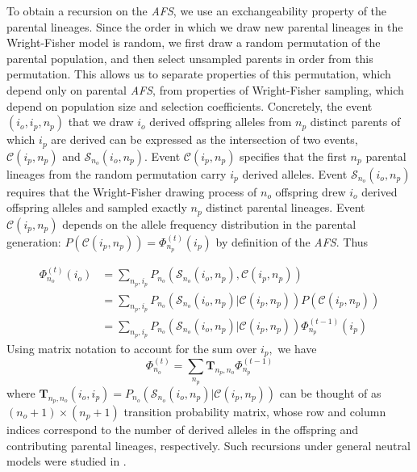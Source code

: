 \documentclass[review,nonatbib]{elsarticle}
\newcommand{\afs}[2]{\Phi_{#1}^{(#2)}}
\begin{document}
To obtain a recursion on the
\textit{AFS}, we use an exchangeability property of the parental lineages. Since the order in which we
draw new parental lineages in the Wright-Fisher model is random, we first draw a random permutation 
of the parental population, and then select unsampled parents in order from this permutation. 
This allows us to separate properties of this permutation,
which depend only on parental \textit{AFS}, from properties of Wright-Fisher sampling, which depend
on population size and selection coefficients. Concretely, the event $(i_o,i_p,n_p)$ that we draw
$i_o$ derived offspring alleles from $n_p$ distinct parents of which $i_p$ are derived can be
expressed as the intersection of two events, $\mathcal{C}(i_p,n_p)$ and $\mathcal{S}_{n_o}(i_o,
n_p)$. Event $\mathcal{C}(i_p,n_p)$ specifies that the first $n_p$ parental lineages from the random
permutation carry $i_p$ derived alleles. Event $\mathcal{S}_{n_o}(i_o, n_p)$ requires that the
Wright-Fisher drawing process of $n_o$ offspring drew $i_o$ derived offspring alleles and sampled
exactly $n_p$ distinct parental lineages. Event $\mathcal{C}(i_p, n_p)$ depends on the allele
frequency distribution in the parental generation: $P(\mathcal{C}(i_p,n_p)) =\afs{n_p}{t} (i_p)$ by
definition of the \textit{AFS}. Thus

\begin{equation}
  \begin{split}
    \afs{n_o}{t}(i_o)&= \sum_{n_p,i_p} P_{n_o}(\mathcal{S}_{n_o}(i_o, n_p), \mathcal{C}(i_p,n_p) )\\
    &=   \sum_{n_p,i_p} P_{n_o}(\mathcal{S}_{n_o}(i_o, n_p)| \mathcal{C}(i_p,n_p) ) P(\mathcal{C}(i_p,n_p))\\
    &=   \sum_{n_p,i_p} P_{n_o}(\mathcal{S}_{n_o}(i_o, n_p)| \mathcal{C}(i_p,n_p) )  \afs{n_p}{t-1}(i_p)%
  \end{split}
\end{equation}
Using matrix notation to account for the sum over $i_p,$ we have
\begin{equation}
  \afs{n_o}{t} = \sum_{n_p}  \mathbf{T}_{n_p,n_o}     \afs{n_p}{t-1}
    \label{eq_recur}
  \end{equation}
where $\mathbf{T}_{n_p,n_o}(i_o,i_p) = P_{n_o}(\mathcal{S}_{n_o}(i_o, n_p)| \mathcal{C}(i_p,n_p) ) $ can be thought of as $(n_o+1) \times (n_p+1)$ transition
probability matrix, whose row and column indices correspond to the number of derived alleles in the
offspring and contributing parental lineages, respectively. Such recursions under general neutral models were studied in \cite{Lessard}.
\end{document}
